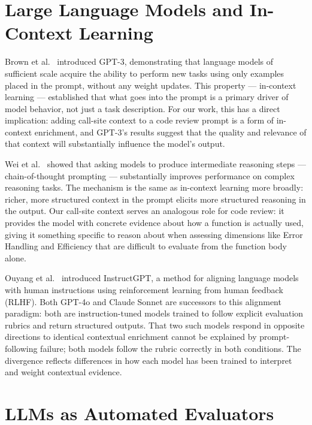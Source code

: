 \documentclass[12pt]{report}
\begin{document}
\section{Large Language Models and In-Context Learning}

Brown et al.~\cite{brown2020gpt3} introduced GPT-3, demonstrating that language models of sufficient scale acquire the ability to perform new tasks using only examples placed in the prompt, without any weight updates. This property --- in-context learning --- established that what goes into the prompt is a primary driver of model behavior, not just a task description. For our work, this has a direct implication: adding call-site context to a code review prompt is a form of in-context enrichment, and GPT-3's results suggest that the quality and relevance of that context will substantially influence the model's output.

Wei et al.~\cite{wei2022chain} showed that asking models to produce intermediate reasoning steps --- chain-of-thought prompting --- substantially improves performance on complex reasoning tasks. The mechanism is the same as in-context learning more broadly: richer, more structured context in the prompt elicits more structured reasoning in the output. Our call-site context serves an analogous role for code review: it provides the model with concrete evidence about how a function is actually used, giving it something specific to reason about when assessing dimensions like Error Handling and Efficiency that are difficult to evaluate from the function body alone.

Ouyang et al.~\cite{ouyang2022instructgpt} introduced InstructGPT, a method for aligning language models with human instructions using reinforcement learning from human feedback (RLHF). Both GPT-4o and Claude Sonnet are successors to this alignment paradigm: both are instruction-tuned models trained to follow explicit evaluation rubrics and return structured outputs. That two such models respond in opposite directions to identical contextual enrichment cannot be explained by prompt-following failure; both models follow the rubric correctly in both conditions. The divergence reflects differences in how each model has been trained to interpret and weight contextual evidence.

\section{LLMs as Automated Evaluators}
\end{document}

